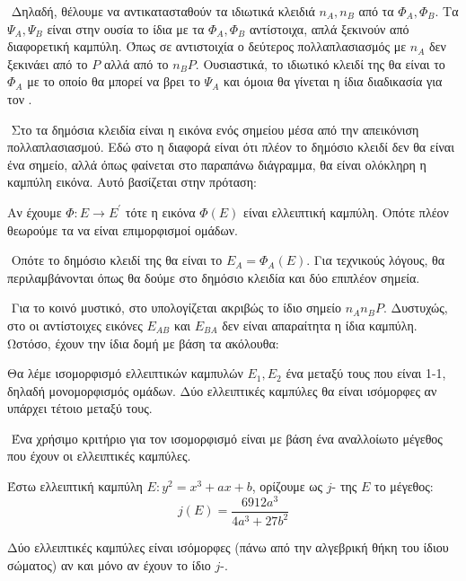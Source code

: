 \documentclass[oneside,a4paper]{article}
\begin{document}
$ $\newline
Δηλαδή, θέλουμε να αντικατασταθούν τα ιδιωτικά κλειδιά $n_A, n_B$ από τα  $\Phi_A, \Phi_B$. Τα $\Psi_A, \Psi_B$ είναι στην ουσία το ίδια με τα $\Phi_A, \Phi_B$ αντίστοιχα, απλά ξεκινούν από διαφορετική καμπύλη. Όπως σε αντιστοιχία ο δεύτερος πολλαπλασιασμός με $n_A$ δεν ξεκινάει από το $P$ αλλά από το $n_B P$.  Ουσιαστικά, το ιδιωτικό κλειδί της  θα είναι το $\Phi_A$ με το οποίο θα μπορεί να βρει το $\Psi_A$ και όμοια θα γίνεται η ίδια διαδικασία για τον .

$ $\newline
Στο  τα δημόσια κλειδία είναι η εικόνα ενός σημείου μέσα από την απεικόνιση πολλαπλασιασμού. Εδώ στο  η διαφορά είναι ότι πλέον το δημόσιο κλειδί δεν θα είναι ένα σημείο, αλλά όπως φαίνεται στο παραπάνω διάγραμμα, θα είναι ολόκληρη η καμπύλη εικόνα. Αυτό βασίζεται στην πρόταση:

\vspace*{0.1cm}
\begin{prop}
	Αν έχουμε  $\Phi:E \rightarrow E^{\prime}$ τότε η εικόνα $\Phi(E)$ είναι ελλειπτική καμπύλη. Οπότε πλέον θεωρούμε τα  να είναι επιμορφισμοί ομάδων.
\end{prop}

$ $\newline
Οπότε το δημόσιο κλειδί της  θα είναι το $E_A = \Phi_A(E)$. Για τεχνικούς λόγους, θα περιλαμβάνονται όπως θα δούμε στο δημόσιο κλειδία και δύο επιπλέον σημεία.

$ $\newline
Για το κοινό μυστικό, στο  υπολογίζεται ακριβώς το ίδιο σημείο $n_A n_B P$. Δυστυχώς, στο  οι αντίστοιχες εικόνες $E_{AB}$ και $E_{BA}$ δεν είναι απαραίτητα η ίδια καμπύλη. Ωστόσο, έχουν την ίδια δομή με βάση τα ακόλουθα:

\vspace*{0.1cm}
\begin{defn}[Ισομορφισμός] Θα λέμε ισομορφισμό ελλειπτικών καμπυλών $E_1,E_2$ ένα  μεταξύ τους που είναι 1-1, δηλαδή μονομορφισμός ομάδων. Δύο ελλειπτικές καμπύλες θα είναι ισόμορφες αν υπάρχει τέτοιο  μεταξύ τους.
\end{defn}

$ $\newline
Ένα χρήσιμο κριτήριο για τον ισομορφισμό είναι με βάση ένα αναλλοίωτο μέγεθος που έχουν οι ελλειπτικές καμπύλες.
\vspace*{0.1cm}
\begin{defn}[$j$-\tl{invariant}]
	Έστω ελλειπτική καμπύλη $E: y^2 = x^3 + ax + b$, ορίζουμε ως $j$- της $E$ το μέγεθος:
	$$j(E) = \frac{6912 a^3}{4a^3 + 27b^2}$$
\end{defn}
\vspace*{0.1cm}
\begin{prop} Δύο ελλειπτικές καμπύλες είναι ισόμορφες (πάνω από την αλγεβρική θήκη του ίδιου σώματος) αν και μόνο αν έχουν το ίδιο $j$-.
\end{prop}
\end{document}
